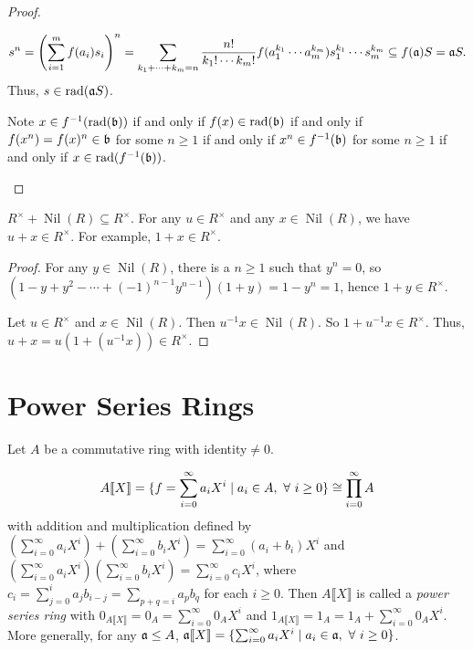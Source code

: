\begin{proof}
\begin{enumerate}
            \[s^n = \left(\sum_{i=1}^m f(a_i)s_i\right)^n = \sum_{k_1 + \cdots + k_m = n} \frac{n!}{k_1! \cdots k_m!} f(a_1^{k_1} \cdots a_m^{k_m}) s_1^{k_1} \cdots s_m^{k_m} \subseteq f(\mathfrak{a})S = \mathfrak{a} S.\]
            Thus, $s \in \operatorname{rad}(\mathfrak{a} S)$. \par
            Note $x \in f^{-1}(\operatorname{rad}(\mathfrak{b}))$ if and only if $f(x) \in \operatorname{rad}(\mathfrak{b})$ if and only if $f(x^n) = f(x)^n \in \mathfrak{b}$ for some $n \geq 1$ if and only if $x^n  \in f^{-1}(\mathfrak{b})$ for some $n \geq 1$ if and only if $x \in \operatorname{rad}(f^{-1}(\mathfrak{b}))$. \qedhere
    \end{enumerate}
\end{proof}

\begin{proposition}
    $R^\times + \operatorname{Nil}(R) \subseteq R^\times$. For any $u \in R^\times$ and any $x \in \operatorname{Nil}(R)$, we have $u+x \in R^\times$. For example, $1+x \in R^\times$.
\end{proposition}

\begin{proof}
    For any $y \in \operatorname{Nil}(R)$, there is a $n \geq 1$ such that $y^n = 0$, so $(1-y+y^2-\cdots+(-1)^{n-1}y^{n-1})(1+y) = 1-y^n = 1$, hence $1+y \in R^\times$. \par 
    Let $u \in R^\times$ and $x \in \operatorname{Nil}(R)$. Then $u^{-1}x \in \operatorname{Nil}(R)$. So $1+u^{-1}x \in R^\times$. Thus, $u + x = u(1+(u^{-1}x)) \in R^\times$. 
\end{proof}

\section*{Power Series Rings}

Let $A$ be a commutative ring with identity$\neq 0$.

\begin{definition}
    \[A \llbracket X \rrbracket = \{f = \sum_{i=0}^\infty a_iX^i \mid a_i \in A, \ \forall \  i \geq 0\} \cong \prod_{i=0}^\infty A\] 
    with addition and multiplication defined by $(\sum_{i=0}^\infty a_iX^i) + (\sum_{i=0}^\infty b_iX^i) = \sum_{i=0}^\infty (a_i+b_i)X^i$ and $(\sum_{i=0}^\infty a_iX^i)(\sum_{i=0}^\infty b_iX^i) = \sum_{i=0}^\infty c_iX^i$, where $c_i = \sum_{j=0}^i a_jb_{i-j} = \sum_{p+q = i}a_pb_q$ for each $i \geq 0$. Then $A\llbracket X \rrbracket$ is called a \emph{power series ring} with $0_{A\llbracket X \rrbracket} = 0_A = \sum_{i=0}^\infty 0_AX^i$ and $1_{A\llbracket X \rrbracket} = 1_A = 1_A + \sum_{i=0}^\infty 0_A X^i$. More generally, for any $\mathfrak{a} \leq A$, $\mathfrak{a}\llbracket X \rrbracket = \{\sum_{i=0}^\infty a_iX^i \mid a_i \in \mathfrak{a}, \ \forall \  i \geq 0\}$.
\end{definition}

